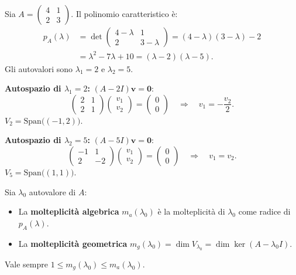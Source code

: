 \begin{examplebox}
Sia $A = \begin{pmatrix} 4 & 1 \\ 2 & 3 \end{pmatrix}$. Il polinomio caratteristico è:
\begin{align*}
p_A(\lambda) &= \det\begin{pmatrix} 4 - \lambda & 1 \\ 2 & 3 - \lambda \end{pmatrix} = (4 - \lambda)(3 - \lambda) - 2 \\
&= \lambda^2 - 7\lambda + 10 = (\lambda - 2)(\lambda - 5).
\end{align*}
Gli autovalori sono $\lambda_1 = 2$ e $\lambda_2 = 5$.

\textbf{Autospazio di $\lambda_1 = 2$:} $(A - 2I)\mathbf{v} = \mathbf{0}$:
\[ \begin{pmatrix} 2 & 1 \\ 2 & 1 \end{pmatrix} \begin{pmatrix} v_1 \\ v_2 \end{pmatrix} = \begin{pmatrix} 0 \\ 0 \end{pmatrix} \quad \Longrightarrow \quad v_1 = -\frac{v_2}{2}. \]
$V_2 = \text{Span}\big((-1, 2)\big)$.

\textbf{Autospazio di $\lambda_2 = 5$:} $(A - 5I)\mathbf{v} = \mathbf{0}$:
\[ \begin{pmatrix} -1 & 1 \\ 2 & -2 \end{pmatrix} \begin{pmatrix} v_1 \\ v_2 \end{pmatrix} = \begin{pmatrix} 0 \\ 0 \end{pmatrix} \quad \Longrightarrow \quad v_1 = v_2. \]
$V_5 = \text{Span}\big((1, 1)\big)$.
\end{examplebox}

\begin{definitionbox}[Molteplicità]
Sia $\lambda_0$ autovalore di $A$:
\begin{itemize}
    \item La \textbf{molteplicità algebrica} $m_a(\lambda_0)$ è la molteplicità di $\lambda_0$ come radice di $p_A(\lambda)$.
    \item La \textbf{molteplicità geometrica} $m_g(\lambda_0) = \dim V_{\lambda_0} = \dim\ker(A - \lambda_0 I)$.
\end{itemize}
Vale sempre $1 \leq m_g(\lambda_0) \leq m_a(\lambda_0)$.
\end{definitionbox}

